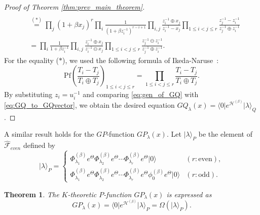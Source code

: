\documentclass{amsart}
\newtheorem{thm}{Theorem}[section]
\def\ket#1{\vert #1 \rangle}
\def\bra#1{\langle #1 \vert}
\begin{document}
\begin{proof}[Proof of Theorem \ref{thm:prev_main_theorem}]
\begin{align*}
\\
&
\stackrel{(\ast)}{=}
\prod_j{(1+\beta x_j)^{r}}
\prod_i\frac{1}{(1+\beta z_i^{-1})^{r-i+1}}
\prod_{i,j}\frac{z_i^{-1}\oplus x_j}{z_i^{-1}-x_j}
\prod_{1\leq i<j\leq r}
\frac{z_j^{-1}-z_i^{-1}}{z_j^{-1}\oplus z_i^{-1}}\\
&=
\prod_i\frac{1}{1+\beta z_i^{-1}}
\prod_{i,j}\frac{z_i^{-1}\oplus x_j}{z_i^{-1}\ominus x_j}
\prod_{1\leq i<j\leq r}
\frac{z_j^{-1}\ominus z_i^{-1}}{z_j^{-1}\oplus z_i^{-1}}.
\end{align*}
For the equality ($\ast$), we used the following formula of Ikeda-Naruse~\cite[Lemma 2.4]{IKEDA201322}:
\begin{equation}\label{eq:IN-formula}
\mathrm{Pf}\left(
\frac{T_i-T_j}{T_i\oplus T_j}
\right)_{1\leq i<j\leq r}=
\prod_{1\leq i<j\leq r}\frac{T_i-T_j}{T_i\oplus T_j}.
\end{equation}
By substituting $z_i=u_i^{-1}$ and comparing \eqref{eq:gen_of_GQ} with \eqref{eq:GQ_to_GQvector}, we obtain the desired equation $GQ_\lambda(x)=\bra{0}e^{\mathcal{H}^{(\beta)}}\ket{\lambda}_Q$.
\end{proof}

A similar result holds for the $GP$-function $GP_\lambda(x)$.
Let $\ket{\lambda}_P$ be the element of $\widehat{\mathcal{F}}_{even}$ defined by
\begin{equation}\label{eq:vector_P}
\ket{\lambda}_P=
\begin{cases}
\Phi^{(\beta)}_{\lambda_1}e^{\Theta}
\Phi^{(\beta)}_{\lambda_2}e^{\Theta}\cdots
\Phi^{(\beta)}_{\lambda_r}e^{\Theta}\ket{0} & (r:\mbox{even}),\\
\Phi^{(\beta)}_{\lambda_1}e^{\Theta}
\Phi^{(\beta)}_{\lambda_2}e^{\Theta}\cdots
\Phi^{(\beta)}_{\lambda_r}e^{\Theta}
\phi^{(\beta)}_{0}e^{\Theta}
\ket{0}  & (r:\mbox{odd}).
\end{cases}
\end{equation}

\begin{thm}\label{thm:GP}
The $K$-theoretic $P$-function $GP_\lambda(x)$ is expressed as
\[
GP_\lambda(x)=\bra{0}e^{\mathcal{H}^{(\beta)}}\ket{\lambda}_P=\Omega(\ket{\lambda}_P).
\]
\end{thm}
\end{document}
